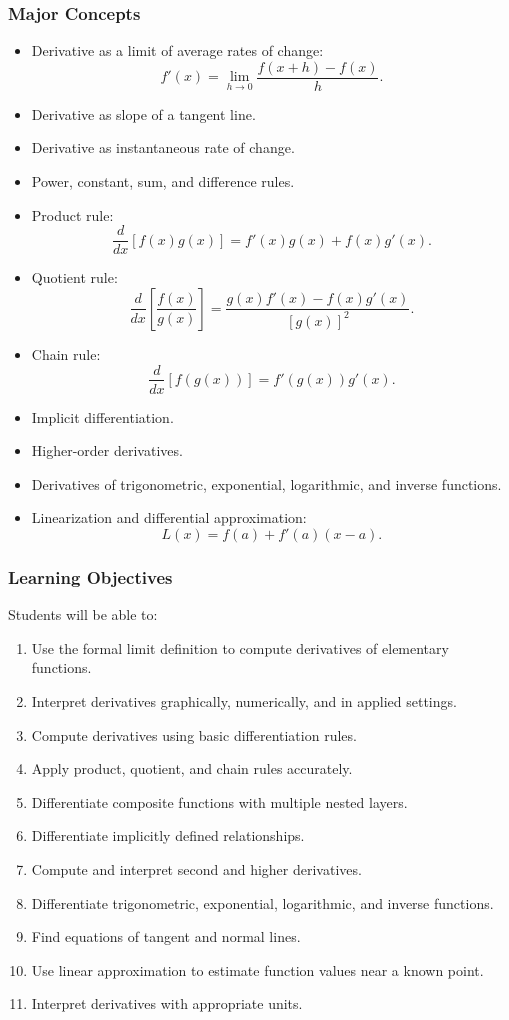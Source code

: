 \documentclass[11pt]{article}
\begin{document}
\subsubsection{Major Concepts}

\begin{itemize}
    \item Derivative as a limit of average rates of change:
    \[
        f'(x) = \lim_{h \to 0}\frac{f(x+h)-f(x)}{h}.
    \]
    \item Derivative as slope of a tangent line.
    \item Derivative as instantaneous rate of change.
    \item Power, constant, sum, and difference rules.
    \item Product rule:
    \[
        \frac{d}{dx}[f(x)g(x)] = f'(x)g(x) + f(x)g'(x).
    \]
    \item Quotient rule:
    \[
        \frac{d}{dx}\left[\frac{f(x)}{g(x)}\right]
        =
        \frac{g(x)f'(x)-f(x)g'(x)}{[g(x)]^2}.
    \]
    \item Chain rule:
    \[
        \frac{d}{dx}[f(g(x))] = f'(g(x))g'(x).
    \]
    \item Implicit differentiation.
    \item Higher-order derivatives.
    \item Derivatives of trigonometric, exponential, logarithmic, and inverse functions.
    \item Linearization and differential approximation:
    \[
        L(x) = f(a) + f'(a)(x-a).
    \]
\end{itemize}

\subsubsection{Learning Objectives}

Students will be able to:

\begin{enumerate}
    \item Use the formal limit definition to compute derivatives of elementary functions.
    \item Interpret derivatives graphically, numerically, and in applied settings.
    \item Compute derivatives using basic differentiation rules.
    \item Apply product, quotient, and chain rules accurately.
    \item Differentiate composite functions with multiple nested layers.
    \item Differentiate implicitly defined relationships.
    \item Compute and interpret second and higher derivatives.
    \item Differentiate trigonometric, exponential, logarithmic, and inverse functions.
    \item Find equations of tangent and normal lines.
    \item Use linear approximation to estimate function values near a known point.
    \item Interpret derivatives with appropriate units.
\end{enumerate}
\end{document}
